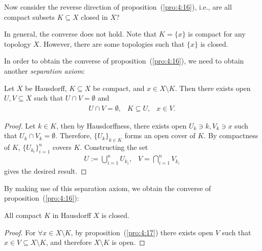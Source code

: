 \begin{remark}
Now consider the reverse direction of proposition~(\ref{pro:4:16}), i.e., are all compact subsets $K\subseteq X$ closed in $X$?

In general, the converse does not hold. Note that $K=\{x\}$ is compact for any topology $X$. However, there are some topologies such that $\{x\}$ is closed.
\end{remark}

In order to obtain the converse of proposition~(\ref{pro:4:16}), we need to obtain another \emph{separation axiom}:
\begin{proposition}\label{pro:4:17}
Let $X$ be Hausdorff, $K\subseteq X$ be compact, and $x\in X\setminus K$. 
Then there exists open $U,V\subseteq X$ such that 
$U\cap V=\emptyset$ and
\[
\begin{array}{lll}
U\cap V=\emptyset,
&
K\subseteq U,& x\in V.
\end{array}
\] 
\end{proposition}
\begin{proof}
Let $k\in K$, then by Hausdorffness, there exists open $U_k\ni k,V_k\ni x$ such that $U_k\cap V_k=\emptyset$.
Therefore, $\{U_k\}_{k\in K}$ forms an open cover of $K$. By compactness of $K$, $\{U_{k_i}\}_{i=1}^n$ covers $K$.
Constructing the set
\[
\begin{array}{ll}
U:=\bigcup_{i=1}^nU_{k_i},
&
V=\bigcap_{i=1}^nV_{k_i}
\end{array}
\]
gives the desired result.
\end{proof}
By making use of this separation axiom, we obtain the converse of proposition~(\ref{pro:4:16}):
\begin{corollary}
All compact $K$ in Hausdorff $X$ is closed.
\end{corollary}
\begin{proof}
For $\forall x\in X\setminus K$, by proposition~(\ref{pro:4:17}) there exists open $V$ such that $x\in V\subseteq X\setminus K$, and therefore $X\setminus K$ is open.
\end{proof}














